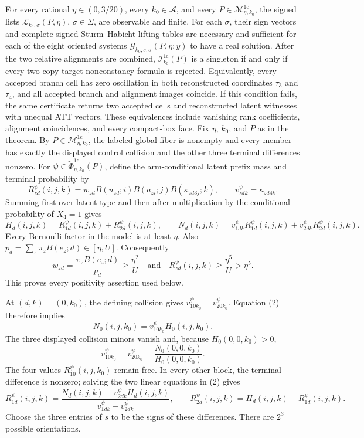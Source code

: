 For every rational \(\eta\in(0,3/20)\), every \(k_0\in\mathcal A\), and every \(P\in\mathcal M_{\eta,k_0}^{1\mathrm c}\), the signed lists \(\mathscr L_{k_0,\sigma}(P,\eta)\), \(\sigma\in\Sigma\), are observable and finite.  For each \(\sigma\), their sign vectors and complete signed Sturm--Habicht lifting tables are necessary and sufficient for each of the eight oriented systems \(\mathscr G_{k_0,s,\sigma}(P,\eta;y)\) to have a real solution.  After the two relative alignments are combined, \(\mathcal I_{k_0}^{1\mathrm c}(P)\) is a singleton if and only if every two-copy target-nonconstancy formula is rejected.  Equivalently, every accepted branch cell has zero oscillation in both reconstructed coordinates \(\tau_3\) and \(\tau_4\), and all accepted branch and alignment images coincide.  If this condition fails, the same certificate returns two accepted cells and reconstructed latent witnesses with unequal ATT vectors.  These equivalences include vanishing rank coefficients, alignment coincidences, and every compact-box face.
Fix \(\eta\), \(k_0\), and \(P\) as in the theorem.  By \(P\in\mathcal M_{\eta,k_0}^{1\mathrm c}\), the labeled global fiber is nonempty and every member has exactly the displayed control collision and the other three terminal differences nonzero.  For \(\psi\in\widetilde\Phi_{\eta,k_0}^{1\mathrm c}(P)\), define the arm-conditional latent prefix mass and terminal probability by
\[
 R_{zd}^{\psi}(i,j,k)
 =w_{zd}B(u_{zd};i)B(a_{zi};j)B(\kappa_{zd3j};k),
 \qquad v_{zdk}^{\psi}=\kappa_{zd4k}.
 \tag{1}
\]
Summing first over latent type and then after multiplication by the conditional probability of \(X_4=1\) gives
\[
 H_d(i,j,k)=R_{1d}^{\psi}(i,j,k)+R_{2d}^{\psi}(i,j,k),
 \qquad
 N_d(i,j,k)=v_{1dk}^{\psi}R_{1d}^{\psi}(i,j,k)+v_{2dk}^{\psi}R_{2d}^{\psi}(i,j,k).
 \tag{2}
\]
Every Bernoulli factor in the model is at least \(\eta\).  Also \(p_d=\sum_z\pi_zB(e_z;d)\in[\eta,U]\).  Consequently
\[
 w_{zd}=\frac{\pi_zB(e_z;d)}{p_d}\geq\frac{\eta^2}{U}
 \quad\text{and}\quad
 R_{zd}^{\psi}(i,j,k)\geq\frac{\eta^5}{U}>\eta^5.
 \tag{3}
\]
This proves every positivity assertion used below.

At \((d,k)=(0,k_0)\), the defining collision gives \(v_{10k_0}^{\psi}=v_{20k_0}^{\psi}\).  Equation (2) therefore implies
\[
 N_0(i,j,k_0)=v_{10k_0}^{\psi}H_0(i,j,k_0).
\]
The three displayed collision minors vanish and, because \(H_0(0,0,k_0)>0\),
\[
 v_{10k_0}^{\psi}=v_{20k_0}^{\psi}
 =\frac{N_0(0,0,k_0)}{H_0(0,0,k_0)}.
 \tag{4}
\]
The four values \(R_{10}^{\psi}(i,j,k_0)\) remain free.  In every other block, the terminal difference is nonzero; solving the two linear equations in (2) gives
\[
 R_{1d}^{\psi}(i,j,k)
 =\frac{N_d(i,j,k)-v_{2dk}^{\psi}H_d(i,j,k)}{v_{1dk}^{\psi}-v_{2dk}^{\psi}},
 \qquad R_{2d}^{\psi}(i,j,k)=H_d(i,j,k)-R_{1d}^{\psi}(i,j,k).
 \tag{5}
\]
Choose the three entries of \(s\) to be the signs of these differences.  There are \(2^3\) possible orientations.

